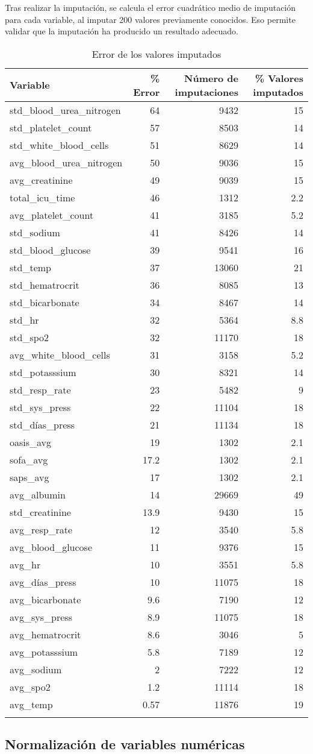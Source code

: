 \documentclass{report}
\begin{document}
Tras realizar la imputación, se calcula el error cuadrático medio de imputación para cada variable, al imputar 200 valores previamente conocidos. Eso permite validar que la imputación ha producido un resultado adecuado. 
\begin{longtable}[]{@{}lrrr@{}}
\toprule
Variable & \% Error & Número de imputaciones & \% Valores
imputados\tabularnewline
\midrule
\endhead
std\_blood\_urea\_nitrogen & 64 & 9432 & 15\tabularnewline
std\_platelet\_count & 57 & 8503 & 14\tabularnewline
std\_white\_blood\_cells & 51 & 8629 & 14\tabularnewline
avg\_blood\_urea\_nitrogen & 50 & 9036 & 15\tabularnewline
avg\_creatinine & 49 & 9039 & 15\tabularnewline
total\_icu\_time & 46 & 1312 & 2.2\tabularnewline
avg\_platelet\_count & 41 & 3185 & 5.2\tabularnewline
std\_sodium & 41 & 8426 & 14\tabularnewline
std\_blood\_glucose & 39 & 9541 & 16\tabularnewline
std\_temp & 37 & 13060 & 21\tabularnewline
std\_hematrocrit & 36 & 8085 & 13\tabularnewline
std\_bicarbonate & 34 & 8467 & 14\tabularnewline
std\_hr & 32 & 5364 & 8.8\tabularnewline
std\_spo2 & 32 & 11170 & 18\tabularnewline
avg\_white\_blood\_cells & 31 & 3158 & 5.2\tabularnewline
std\_potasssium & 30 & 8321 & 14\tabularnewline
std\_resp\_rate & 23 & 5482 & 9\tabularnewline
std\_sys\_press & 22 & 11104 & 18\tabularnewline
std\_días\_press & 21 & 11134 & 18\tabularnewline
oasis\_avg & 19 & 1302 & 2.1\tabularnewline
sofa\_avg & 17.2 & 1302 & 2.1\tabularnewline
saps\_avg & 17 & 1302 & 2.1\tabularnewline
avg\_albumin & 14 & 29669 & 49\tabularnewline
std\_creatinine & 13.9 & 9430 & 15\tabularnewline
avg\_resp\_rate & 12 & 3540 & 5.8\tabularnewline
avg\_blood\_glucose & 11 & 9376 & 15\tabularnewline
avg\_hr & 10 & 3551 & 5.8\tabularnewline
avg\_días\_press & 10 & 11075 & 18\tabularnewline
avg\_bicarbonate & 9.6 & 7190 & 12\tabularnewline
avg\_sys\_press & 8.9 & 11075 & 18\tabularnewline
avg\_hematrocrit & 8.6 & 3046 & 5\tabularnewline
avg\_potasssium & 5.8 & 7189 & 12\tabularnewline
avg\_sodium & 2 & 7222 & 12\tabularnewline
avg\_spo2 & 1.2 & 11114 & 18\tabularnewline
avg\_temp & 0.57 & 11876 & 19\tabularnewline

\bottomrule

\caption {Error de los valores imputados}
\end{longtable}

\subsection{Normalización de variables numéricas}
\end{document}
